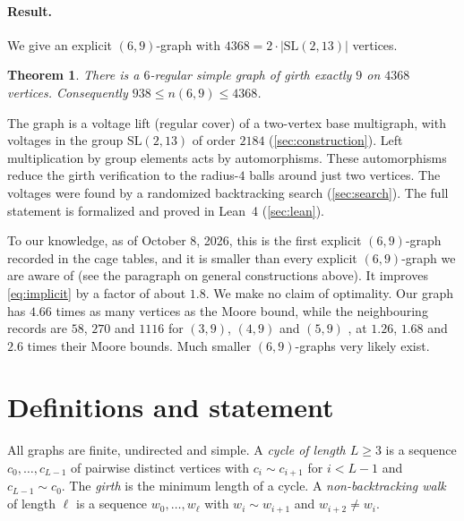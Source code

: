 \documentclass[11pt]{article}
\numberwithin{equation}{section}
\newtheorem{theorem}{Theorem}[section]
\theoremstyle{definition}
\theoremstyle{remark}
\newcommand{\SL}{\mathrm{SL}}
\begin{document}
\paragraph{Result.}
We give an explicit $(6,9)$-graph with $4368=2\cdot|\SL(2,13)|$ vertices.

\begin{theorem}\label{thm:main}
There is a $6$-regular simple graph of girth exactly $9$ on $4368$ vertices. Consequently
$938\le n(6,9)\le 4368$.
\end{theorem}

The graph is a voltage lift (regular cover) of a two-vertex base multigraph, with voltages in
the group $\SL(2,13)$ of order $2184$ (\cref{sec:construction}). Left multiplication by group
elements acts by automorphisms. These automorphisms reduce the girth verification to the
radius-$4$ balls around just two vertices. The voltages were found by a randomized backtracking
search (\cref{sec:search}). The full statement is formalized and proved in Lean~4
(\cref{sec:lean}).

To our knowledge, as of October 8, 2026, this is the first explicit $(6,9)$-graph recorded in
the cage tables, and it is smaller than every explicit $(6,9)$-graph we are aware of (see the
paragraph on general constructions above).
It improves \eqref{eq:implicit} by a factor of about $1.8$. We make no claim of optimality.
Our graph has $4.66$ times as many vertices as the Moore bound, while the neighbouring records are
$58$, $270$ and $1116$ for $(3,9)$, $(4,9)$ and $(5,9)$ \cite{EGJSV}, at
$1.26$, $1.68$ and $2.6$ times their Moore bounds. Much smaller $(6,9)$-graphs very likely exist.

\section{Definitions and statement}\label{sec:defs}

All graphs are finite, undirected and simple. A \emph{cycle of length $L\ge 3$} is a sequence
$c_0,\dots,c_{L-1}$ of pairwise distinct vertices with $c_i\sim c_{i+1}$ for $i<L-1$ and
$c_{L-1}\sim c_0$. The \emph{girth} is the minimum length of a cycle.
A \emph{non-backtracking walk} of length $\ell$ is a sequence $w_0,\dots,w_\ell$ with
$w_{i}\sim w_{i+1}$ and $w_{i+2}\ne w_i$.
\end{document}
